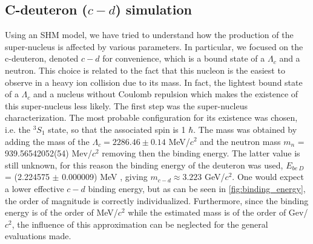 \documentclass[12pt,a4paper]{book}
\begin{document}
	
	\FloatBarrier
	\subsection{C-deuteron ($c-d$) simulation}
	Using an SHM model, we have tried to understand how the production of the super-nucleus is affected by various parameters. In particular, we focused on the c-deuteron, denoted $c-d$ for convenience, which is a bound state of a $\Lambda_c$ and a neutron. This choice is related to the fact that this nucleon is the easiest to observe in a heavy ion collision due to its mass. In fact, the lightest bound state of a $\Lambda_c$ and a nucleus without Coulomb repulsion which makes the existence of this super-nucleus less likely.
	The first step was the super-nucleus characterization. The most probable configuration for its existence was chosen, i.e. the $^{3}S_1$ state, so that the associated spin is 1 $\hbar$. The mass was obtained by adding the mass of the $\Lambda_c = 2286.46 \pm 0.14$ MeV/$c^2$ and the neutron mass $m_n$ = 939.56542052(54) Mev/$c^2$ \cite{ParticleDataGroup:2024cfk} removing then the binding energy. The latter value is still unknown, for this reason the binding energy of the deuteron was used, $E_{be\ D}$= (2.224575 $\pm$ 0.000009) MeV \cite{VANDERLEUN1982261}, giving $m_{c-d} \approx 3.223$ GeV/$c^2$. One would expect a lower effective $c-d$ binding energy, but as can be seen in \ref{fig:binding_energy}, the order of magnitude is correctly individualized. Furthermore, since the binding energy is of the order of MeV/$c^2$ while the estimated mass is of the order of Gev/$c^2$, the influence of this approximation can be neglected for the general evaluations made.
	
\end{document}
